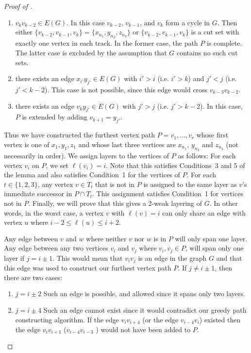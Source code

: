 \documentclass{patmorin}
\begin{document}
\begin{proof}[Proof of ]
  \begin{enumerate}
  \item $v_k v_{k-2}\in E(G)$.  In this
  case $v_{k-2}$, $v_{k-1}$, and $v_k$ form a cycle in $G$.  Then either
  $\{v_{k-2},v_{k-1},v_{k}\}=\{x_{n_1},y_{n_2},z_{n_3}\}$ or
  $\{v_{k-2},v_{k-1},v_{k}\}$ is a cut set with exactly one vertex in
  each track.  In the former case, the path $P$ is complete. The latter case is  excluded by the assumption that $G$ contains no such cut sets.

  \item there exists an edge $x_{i'}y_{j'}\in E(G)$ with $i' > i$
    (i.e. $i' > k$) and $j'< j$ (i.e. $j'< k-2$).  This case is not possible, since this edge would cross $v_{k-3}v_{k-2}$.

  \item there exists an edge $v_k y_{j'}\in E(G)$ with $j' >j$  (i.e. $j'> k-2$).  In this case, $P$ is extended by adding $v_{k+1}=y_{j'}$.
  \end{enumerate}


  Thus we have constructed the furthest vertex path $P=v_1,\ldots,v_r$ whose first vertex is one of
  $x_1,y_1,z_1$ and whose last three vertices are $x_{n_1}$,
  $y_{n_2}$ and $z_{n_3}$ (not necessarily in order).  We assign layers
  to the vertices of $P$ as follows: For each vertex $v_i$ on $P$,
  we set $\ell(v_i)=i$.  Note that this satisfies Conditions~3 and 5
  of the lemma and also satisfies Condition~1 for the vertices of $P$.
  For each $t\in\{1,2,3\}$, any vertex $v\in T_t$ that is not in
  $P$ is assigned to the same layer as $v$'s immediate successor in $P\cap T_t$. 
  This assignment satisfies Condition~1 for vertices not in $P$.  
  Finally, we will prove that this gives a 2-weak layering of $G$. In other words,
  in the worst case, a vertex $v$ with $\ell(v)=i$ can only share an edge with vertex $u$ where  $i-2 \le \ell(u) \le i+2$.
  
 Any edge between $v$ and $w$ where neither $v$ nor $w$ is in $P$ will only span one layer.
 Any edge between any two vertices $v_i$ and $v_j$ where $v_i, v_j \in P$, will span only one layer if $j = i\pm1$. 
 This would mean that $v_{i}v_{j}$ is an edge in the graph $G$
 and that this edge was used to construct our furthest vertex path $P$.
 If $j \neq i\pm1$, then there are two cases:
   \begin{enumerate}
	\item $j = i \pm 2$ Such an edge is possible, and allowed since it spans only two layers. %
	\item $j = i \pm 4$ Such an edge cannot exist since it would contradict our greedy path constructing algorithm. 
	If the edge $v_iv_{i+4}$ (or the edge $v_{i-4}v_i$) existed then the edge $v_i v_{i+1}$ ($v_{i-4}v_{i-3}$ ) would not have been added to $P$.
   \end{enumerate}


\end{proof}
\end{document}
